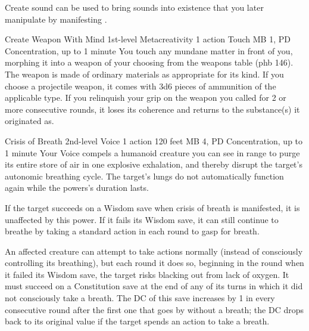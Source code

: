 Create sound can be used to bring sounds into existence
that you later manipulate by manifesting .

\DndPowerHeader%
  {Create Weapon With Mind}
  {1st-level Metacreativity}
  {1 action}
  {Touch}
  {MB 1, PD \lvlone}
  {Concentration, up to 1 minute}
You touch any mundane matter in front of you,
morphing it into a weapon of your choosing
from the weapons table (phb 146).
The weapon is made of ordinary materials
as appropriate for its kind.
If you choose a projectile weapon,
it comes with 3d6 pieces of ammunition
of the applicable type.
If you relinquish your grip on the weapon you called
for 2 or more consecutive rounds,
it loses its coherence and returns to the substance(s)
it originated as.

\DndPowerHeader%
  {Crisis of Breath}
  {2nd-level Voice}
  {1 action}
  {120 feet}
  {MB 4, PD \lvlthree}
  {Concentration, up to 1 minute}
Your Voice compels a humanoid creature you can see in range
to purge its entire store of air
in one explosive exhalation,
and thereby disrupt the target's autonomic breathing cycle.
The target's lungs do not automatically function
again while the powers's duration lasts.

If the target succeeds on a Wisdom save when
crisis of breath is manifested,
it is unaffected by this power.
If it fails its Wisdom save,
it can still continue to breathe by taking a standard action
in each round to gasp for breath.

An affected creature can attempt to take actions normally
(instead of consciously controlling its breathing),
but each round it does so,
beginning in the round when it failed its Wisdom save,
the target risks blacking out from lack of oxygen.
It must succeed on a Constitution save
at the end of any of its turns in which
it did not consciously take a breath.
The DC of this save increases by 1 in every consecutive
round after the first one that goes by without a breath;
the DC drops back to its original value
if the target spends an action to take a breath.

